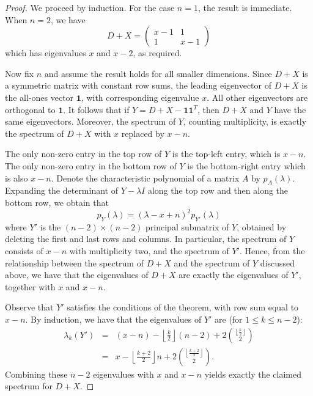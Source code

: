 \begin{proof}
 We proceed by induction.  For the case $n=1$, the result is immediate.  
 When $n=2$, we have
  \[ D+X = \begin{pmatrix}
 x-1 & 1 \\
 1 & x-1
\end{pmatrix} \]
which has eigenvalues $x$ and $x-2$, as required.

Now fix $n$ and assume the result holds for all smaller dimensions. 
Since $D+X$ is a symmetric matrix with constant row sums, the leading 
eigenvector of $D+X$ is
the all-ones vector $\textbf{1}$, with corresponding eigenvalue 
$x$.  All other eigenvectors are orthogonal to $\textbf{1}$.
It follows that if $Y = D+X - \textbf{1}\textbf{1}^T$,
then $D+X$ and $Y$ have the same eigenvectors.   Moreover, 
the spectrum of $Y$, counting multiplicity, is exactly the
spectrum of $D+X$ with $x$ replaced by $x-n$.


The only non-zero entry in the top row of $Y$ is the top-left entry, which
is $x-n$.  The only non-zero entry in the bottom row of $Y$ is the bottom-right entry which is also $x-n$.
Denote the characteristic polynomial of a matrix $A$ by $p_A(\lambda)$.  Expanding the determinant of $Y - \lambda I$
along the top row and then along the bottom row, we obtain that 
 \[ p_Y(\lambda) = (\lambda - x + n)^2 p_{Y'}(\lambda) \]
where $Y'$ is the $(n-2) \times (n-2)$ principal submatrix of $Y$, obtained
by deleting the first and last rows and columns.  In particular, the spectrum
of $Y$ consists of $x-n$ with multiplicity two, and the spectrum of $Y'$.
Hence, from the relationship between the spectrum of $D+X$ and the spectrum of
$Y$ discussed above, we  have that the eigenvalues of $D+X$ are exactly
the eigenvalues of $Y'$, together with $x$ and $x-n$.


Observe that $Y'$ satisfies the conditions of the theorem, with row sum equal 
to $x-n$.  By induction, we have that the eigenvalues of $Y'$ are (for $1 \leq k \leq n-2$):
\begin{eqnarray*}
  \lambda_k(Y') & = & (x-n) - \left\lfloor \frac{k}{2} \right\rfloor (n-2) + 2 \binom{\left\lfloor \frac{k}{2} \right\rfloor}{2} \\
  & = & x - \left\lfloor \frac{k+2}{2} \right\rfloor n + 2 \binom{\left\lfloor \frac{k+2}{2} \right\rfloor}{2} .
\end{eqnarray*}
Combining these $n-2$ eigenvalues with $x$ and $x-n$ yields exactly the claimed spectrum for $D+X$.
\end{proof}

